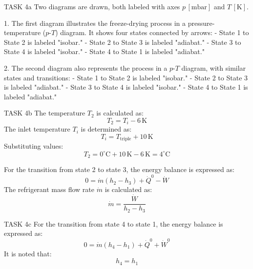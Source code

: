 TASK 4a  
Two diagrams are drawn, both labeled with axes \( p \, [\text{mbar}] \) and \( T \, [\text{K}] \).  

1. The first diagram illustrates the freeze-drying process in a pressure-temperature (\( p \)-\( T \)) diagram. It shows four states connected by arrows:  
   - State 1 to State 2 is labeled "isobar."  
   - State 2 to State 3 is labeled "adiabat."  
   - State 3 to State 4 is labeled "isobar."  
   - State 4 to State 1 is labeled "adiabat."  

2. The second diagram also represents the process in a \( p \)-\( T \) diagram, with similar states and transitions:  
   - State 1 to State 2 is labeled "isobar."  
   - State 2 to State 3 is labeled "adiabat."  
   - State 3 to State 4 is labeled "isobar."  
   - State 4 to State 1 is labeled "adiabat."  

TASK 4b  
The temperature \( T_2 \) is calculated as:  
\[
T_2 = T_i - 6 \, \text{K}
\]  
The inlet temperature \( T_i \) is determined as:  
\[
T_i = T_{\text{triple}} + 10 \, \text{K}
\]  
Substituting values:  
\[
T_2 = 0^\circ \text{C} + 10 \, \text{K} - 6 \, \text{K} = 4^\circ \text{C}
\]  

For the transition from state 2 to state 3, the energy balance is expressed as:  
\[
0 = \dot{m} (h_2 - h_3) + \dot{Q}^0 - \dot{W}
\]  
The refrigerant mass flow rate \( \dot{m} \) is calculated as:  
\[
\dot{m} = \frac{\dot{W}}{h_2 - h_3}
\]  

TASK 4c  
For the transition from state 4 to state 1, the energy balance is expressed as:  
\[
0 = \dot{m} (h_4 - h_1) + \dot{Q}^0 + \dot{W}^0
\]  
It is noted that:  
\[
h_4 = h_1
\]  